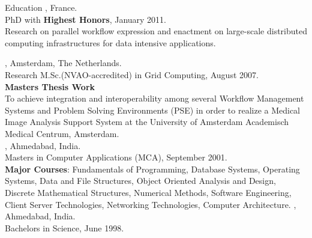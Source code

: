 \documentclass[11pt]{resume}
\author{Ketan C Maheshwari}
\begin{document}
% 
\maketitle



\begin{category}{Education}
, France.\\
PhD with \textbf{Highest Honors}, January 2011.\\
Research on parallel workflow expression and enactment on large-scale
distributed computing infrastructures for data intensive applications. 


, Amsterdam, The Netherlands.\\
Research M.Sc.(NVAO-accredited) in Grid Computing, August 2007.\\
\textbf{Masters Thesis Work}\\
To achieve integration and interoperability among several Workflow Management Systems and Problem Solving Environments (PSE) in order to realize a Medical Image Analysis Support System at the University of Amsterdam Academisch Medical Centrum, Amsterdam.\\
, Ahmedabad, India.\\
Masters in Computer Applications (MCA), September 2001.\\
\textbf{Major Courses}: Fundamentals of Programming, Database Systems, Operating Systems, Data and File Structures, Object Oriented Analysis and Design, Discrete Mathematical Structures, Numerical Methods, Software Engineering, Client Server Technologies, Networking Technologies, Computer Architecture.
, Ahmedabad, India.\\
Bachelors in Science, June 1998.
\end{category}

\end{document}
